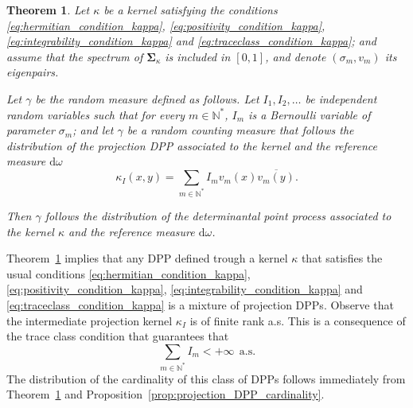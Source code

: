\documentclass[twoside,11pt]{book}
\newtheorem{theorem}{Theorem}
\numberwithin{theorem}{chapter}
\numberwithin{definition}{chapter}
\numberwithin{proposition}{chapter}
\numberwithin{corollary}{chapter}
\numberwithin{example}{chapter}
\numberwithin{lemma}{chapter}
\numberwithin{assumption}{chapter}
\begin{document}
\begin{theorem}\label{thm:mixture_of_projection_DPPs}
Let $\kappa$ be a kernel satisfying the conditions \eqref{eq:hermitian_condition_kappa}, \eqref{eq:positivity_condition_kappa}, \eqref{eq:integrability_condition_kappa} and \eqref{eq:traceclass_condition_kappa}; and assume that the spectrum of $\bm{\Sigma}_{\kappa}$ is included in $[0,1]$, and denote $(\sigma_{m},v_{m})$ its eigenpairs.


Let $\gamma$ be the random measure defined as follows. Let $I_{1},I_{2}, \dots $ be independent random variables such that for every $m \in \mathbb{N}^{*}$, $I_{m}$ is a Bernoulli variable of parameter $\sigma_m$; and let $\gamma$ be a random counting measure that follows the distribution of the projection DPP associated to the kernel and the reference measure $\mathrm{d}\omega$
\begin{equation}
\kappa_{I}(x,y) = \sum\limits_{m \in \mathbb{N}^{*}} I_{m} v_{m}(x)\overline{v_{m}(y)}.
\end{equation}

Then $\gamma$ follows the distribution of the determinantal point process associated to the kernel $\kappa$ and the reference measure $\mathrm{d}\omega$.
\end{theorem}
Theorem~\ref{thm:mixture_of_projection_DPPs} implies that any DPP defined trough a kernel $\kappa$ that satisfies the usual conditions \eqref{eq:hermitian_condition_kappa}, \eqref{eq:positivity_condition_kappa}, \eqref{eq:integrability_condition_kappa} and \eqref{eq:traceclass_condition_kappa} is a mixture of projection DPPs.
Observe that the intermediate projection kernel $\kappa_{I}$ is of finite rank a.s. This is a consequence of the trace class condition that guarantees that 
\begin{equation}
\sum\limits_{m \in \mathbb{N}^{*}} I_{m} <+\infty \:\: \text{a.s.}
\end{equation}
The distribution of the cardinality of this class of DPPs follows immediately from Theorem~\ref{thm:mixture_of_projection_DPPs} and Proposition~\ref{prop:projection_DPP_cardinality}.
\end{document}
